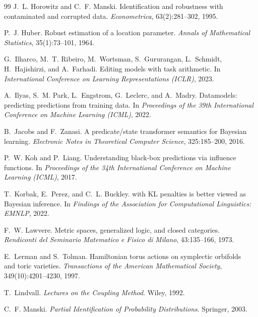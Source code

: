 \documentclass[11pt]{article}
\theoremstyle{definition}
\theoremstyle{remark}
\begin{document}
\begin{thebibliography}{99}
J.~L. Horowitz and C.~F. Manski.
\newblock Identification and robustness with contaminated and corrupted data.
\newblock \emph{Econometrica}, 63(2):281--302, 1995.

P.~J. Huber.
\newblock Robust estimation of a location parameter.
\newblock \emph{Annals of Mathematical Statistics}, 35(1):73--101, 1964.

G.~Ilharco, M.~T. Ribeiro, M.~Wortsman, S.~Gururangan, L.~Schmidt, H.~Hajishirzi, and A.~Farhadi.
\newblock Editing models with task arithmetic.
\newblock In \emph{International Conference on Learning Representations (ICLR)}, 2023.

A.~Ilyas, S.~M. Park, L.~Engstrom, G.~Leclerc, and A.~Madry.
\newblock Datamodels: predicting predictions from training data.
\newblock In \emph{Proceedings of the 39th International Conference on Machine Learning (ICML)}, 2022.

B.~Jacobs and F.~Zanasi.
\newblock A predicate/state transformer semantics for {B}ayesian learning.
\newblock \emph{Electronic Notes in Theoretical Computer Science}, 325:185--200, 2016.

P.~W. Koh and P.~Liang.
\newblock Understanding black-box predictions via influence functions.
\newblock In \emph{Proceedings of the 34th International Conference on Machine Learning (ICML)}, 2017.

T.~Korbak, E.~Perez, and C.~L. Buckley.
 with {KL} penalties is better viewed as {B}ayesian inference.
\newblock In \emph{Findings of the Association for Computational Linguistics: EMNLP}, 2022.

F.~W. Lawvere.
\newblock Metric spaces, generalized logic, and closed categories.
\newblock \emph{Rendiconti del Seminario Matematico e Fisico di Milano}, 43:135--166, 1973.

E.~Lerman and S.~Tolman.
\newblock Hamiltonian torus actions on symplectic orbifolds and toric varieties.
\newblock \emph{Transactions of the American Mathematical Society}, 349(10):4201--4230, 1997.

T.~Lindvall.
\newblock \emph{Lectures on the Coupling Method}.
\newblock Wiley, 1992.

C.~F. Manski.
\newblock \emph{Partial Identification of Probability Distributions}.
\newblock Springer, 2003.


\end{thebibliography}
\end{document}
